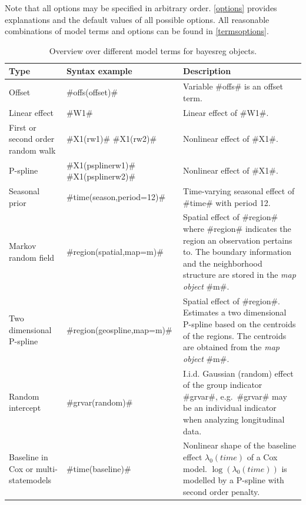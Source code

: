Note that all options may be specified in arbitrary order.
\autoref{options} provides explanations and the default values of
all possible options. All reasonable combinations of model terms
and options can be found in \autoref{termsoptions}.


\begin{table}[ht] \footnotesize
\begin{center}
\begin{tabular}{|p{2.8cm}|p{3.6cm}|p{7.1cm}|}
\hline
{\bf Type} & {\bf Syntax example} & {\bf Description} \\
\hline \hline
Offset & #offs(offset)#  & Variable #offs# is an offset term. \\
\hline
Linear effect & #W1#  & Linear effect of #W1#. \\
\hline
First or second order random walk &   #X1(rw1)#  \newline  #X1(rw2)#  & Nonlinear effect of #X1#. \\
\hline
P-spline &  #X1(psplinerw1)#   \newline  #X1(psplinerw2)#  & Nonlinear effect of #X1#.  \\
\hline
Seasonal prior & #time(season,period=12)# & Time-varying seasonal effect of #time# with period 12. \\
\hline Markov random \newline field &  #region(spatial,map=m)#  &
Spatial effect of #region# where #region# indicates the region an
observation pertains to. The boundary information and the
neighborhood structure are stored in the {\em map object}
#m#. \\
\hline Two dimensional \newline P-spline &
#region(geospline,map=m)# & Spatial effect of #region#. Estimates
a two dimensional P-spline
based on the centroids of the regions. The centroids are obtained from the {\em map object} #m#. \\
\hline Random intercept &  #grvar(random)# & I.i.d. Gaussian
(random) effect of the group indicator #grvar#,
e.g.~#grvar# may be an individual indicator when analyzing longitudinal data.  \\
\hline Baseline in Cox \newline or multi-state\newline models &
#time(baseline)# & Nonlinear shape
of the baseline effect $\lambda_0(time)$ of a Cox model. $\log(\lambda_0(time))$ is modelled by a P-spline with second order penalty. \\
\hline
\end{tabular}
{\em\caption {\label{terms} Overview over different model terms
for bayesreg objects.}}
\end{center}
\end{table}


